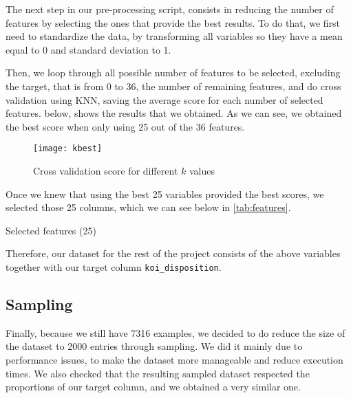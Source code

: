 The next step in our pre-processing script, consists in reducing the number of features
by selecting the ones that provide the best results. To do that, we first need to
standardize the data, by transforming all variables so they have a mean equal to 0
and standard deviation to 1.

Then, we loop through all possible number of features to be selected, 
excluding the target, that is from 0
to 36, the number of remaining features, and do cross validation using KNN, saving
the average score for each number of selected features. 
below, shows the results that we obtained. As we can see, we obtained the best score
when only using 25 out of the 36 features.

\begin{figure}[H]
    \centering
    \texttt{[image: kbest]}
    \caption{Cross validation score for different $k$ values}%
    \label{fig:feature_cross}
\end{figure}

Once we knew that using the best 25 variables provided the best scores, we selected
those 25 columns, which we can see below in \cref{tab:features}.

\begin{table}[H]
    \centering
    \caption{Selected features (25)}%
    \label{tab:features}
    
\end{table}

Therefore, our dataset for the rest of the project consists of the above variables
together with our target column \texttt{koi\_disposition}.

\subsection{Sampling}

Finally, because we still have 7316 examples, we decided to do reduce the size of the
dataset to 2000 entries through sampling. We did it mainly due to performance issues,
to make the dataset more manageable and reduce execution times. We also checked that
the resulting sampled dataset respected the proportions of our
target column, and we obtained a very similar one.